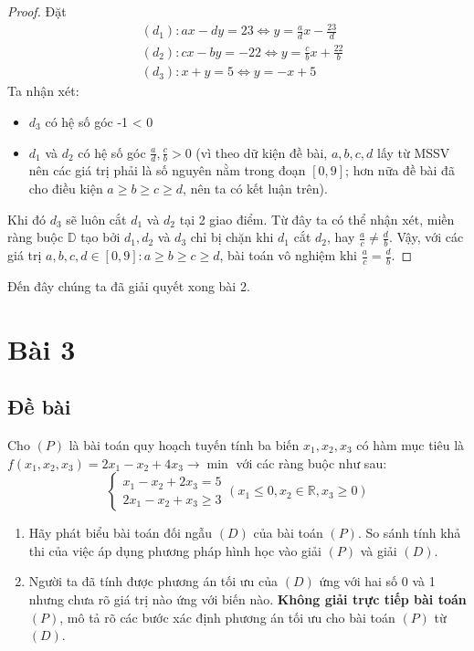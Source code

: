 \documentclass[12pt]{article}
\begin{document}
\begin{proof}
Đặt
$$
\begin{aligned}
&(d_1): ax - dy = 23 \iff y = \frac{a}{d}x - \frac{23}{d} \\
&(d_2): cx - by = -22 \iff y = \frac{c}{b}x + \frac{22}{b} \\
&(d_3): x + y = 5 \iff y = -x + 5
\end{aligned}
$$
Ta nhận xét:
\begin{itemize}
\item $d_3$ có hệ số góc -1 < 0
\item $d_1$ và $d_2$ có hệ số góc $\displaystyle \frac{a}{d}, \frac{c}{b} > 0$ (vì theo dữ kiện đề bài, $a, b, c, d$ lấy từ MSSV nên các giá trị phải là số nguyên nằm trong đoạn $\left[0, 9\right]$; hơn nữa đề bài đã cho điều kiện $a \geq b \geq c \geq d$, nên ta có kết luận trên).
\end{itemize}
Khi đó $d_3$ sẽ luôn cắt $d_1$ và $d_2$ tại 2 giao điểm. Từ đây ta có thể nhận xét, miền ràng buộc $\mathbb{D}$ tạo bởi $d_1, d_2$ và $d_3$ chỉ bị chặn khi $d_1$ cắt $d_2$, hay $\displaystyle \frac{a}{c} \neq \frac{d}{b}$. Vậy, với các giá trị $a, b, c, d \in [0, 9] : a \geq b \geq c \geq d$, bài toán vô nghiệm khi $\displaystyle \frac{a}{c} = \frac{d}{b}$. 
\end{proof}

\noindent Đến đây chúng ta đã giải quyết xong bài 2.
\pagebreak

\section{Bài 3}
\subsection{Đề bài}
Cho $(P)$ là bài toán quy hoạch tuyến tính ba biến $x_1, x_2, x_3$ có hàm mục tiêu là $f(x_1, x_2, x_3) = 2x_1 - x_2 + 4x_3 \rightarrow \min$ với các ràng buộc như sau:
\begin{equation}
\label{equation-4}
\left\{ 
\begin{aligned}
x_1 - x_2 + 2x_3 = 5 \\
2x_1 - x_2 + x_3 \geq 3 
\end{aligned}
\right.
(x_1 \leq 0, x_2 \in \mathbb{R}, x_3 \geq 0)\end{equation}
\begin{enumerate}[label=(\alph*)]
\item Hãy phát biểu bài toán đối ngẫu $(D)$ của bài toán $(P)$. So sánh tính khả thi của việc áp dụng phương pháp hình học vào giải $(P)$ và giải $(D)$.
\item Người ta đã tính được phương án tối ưu của $(D)$ ứng với hai số 0 và 1 nhưng chưa rõ giá trị nào ứng với biến nào. \textbf{Không giải trực tiếp bài toán $(P)$}, mô tả rõ các bước xác định phương án tối ưu cho bài toán $(P)$ từ $(D)$.
\end{enumerate}
\end{document}
